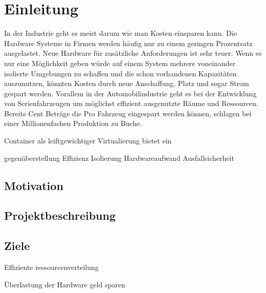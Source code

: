 \thispagestyle{empty}
\section{Einleitung}
In der Industrie geht es meist darum wie man Kosten einsparen kann. Die Hardware Systeme in Firmen werden häufig nur zu einem geringen Prozentsatz ausgelastet. Neue Hardware für zusätzliche Anforderungen ist sehr teuer. Wenn es nur eine Möglichkeit geben würde auf einem System mehrere voneinander isolierte Umgebungen zu schaffen und die schon vorhandenen Kapazitäten auszunutzen, könnten Kosten durch neue Anschaffung, Platz und sogar Strom gespart werden. Vorallem in der Automobilindustrie geht es bei der Entwicklung von Serienfahrzeugen um möglichst effizient ausgenutzte Räume und Ressourcen. Bereits Cent Beträge die Pro Fahrzeug eingespart werden können, schlagen bei einer Millionenfachen Produktion zu Buche. 

Container als leiftgewichtiger Virtualierung bietet ein 

gegenüberstellung Effizienz Isolierung 
Hardwareaufwand
Ausfallsicherheit 

\subsection{Motivation}
\subsection{Projektbeschreibung}
\subsection{Ziele}

Effiziente ressourcenverteilung 

Überlastung der Hardware
geld sparen 




\pagebreak